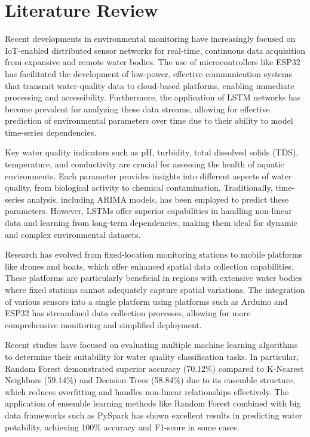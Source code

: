 \documentclass[conference]{IEEEtran}
\begin{document}
\section{Literature Review}
Recent developments in environmental monitoring have increasingly focused on IoT-enabled distributed sensor networks for real-time, continuous data acquisition from expansive and remote water bodies. The use of microcontrollers like ESP32 has facilitated the development of low-power, effective communication systems that transmit water-quality data to cloud-based platforms, enabling immediate processing and accessibility. Furthermore, the application of LSTM networks has become prevalent for analyzing these data streams, allowing for effective prediction of environmental parameters over time due to their ability to model time-series dependencies.

Key water quality indicators such as pH, turbidity, total dissolved solids (TDS), temperature, and conductivity are crucial for assessing the health of aquatic environments. Each parameter provides insights into different aspects of water quality, from biological activity to chemical contamination. Traditionally, time-series analysis, including ARIMA models, has been employed to predict these parameters. However, LSTMs offer superior capabilities in handling non-linear data and learning from long-term dependencies, making them ideal for dynamic and complex environmental datasets.

Research has evolved from fixed-location monitoring stations to mobile platforms like drones and boats, which offer enhanced spatial data collection capabilities. These platforms are particularly beneficial in regions with extensive water bodies where fixed stations cannot adequately capture spatial variations. The integration of various sensors into a single platform using platforms such as Arduino and ESP32 has streamlined data collection processes, allowing for more comprehensive monitoring and simplified deployment.

Recent studies have focused on evaluating multiple machine learning algorithms to determine their suitability for water quality classification tasks. In particular, Random Forest demonstrated superior accuracy (70.12\%) compared to K-Nearest Neighbors (59.14\%) and Decision Trees (58.84\%) due to its ensemble structure, which reduces overfitting and handles non-linear relationships effectively. The application of ensemble learning methods like Random Forest combined with big data frameworks such as PySpark has shown excellent results in predicting water potability, achieving 100\% accuracy and F1-score in some cases.
\end{document}
